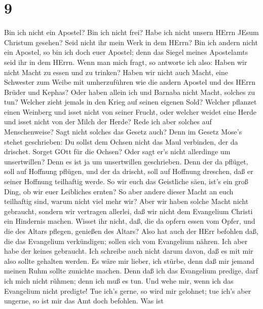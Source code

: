 \hypertarget{section-8}{%
\section{9}\label{section-8}}

 Bin ich nicht ein Apostel? Bin ich nicht frei? Habe ich
nicht unsern HErrn JEsum Christum gesehen? Seid nicht ihr mein Werk in
dem HErrn?  Bin ich andern nicht ein Apostel, so bin ich
doch euer Apostel; denn das Siegel meines Apostelamts seid ihr in dem
HErrn.  Wenn man mich fragt, so antworte ich also:
 Haben wir nicht Macht zu essen und zu trinken? 
Haben wir nicht auch Macht, eine Schwester zum Weibe mit umherzuführen
wie die andern Apostel und des HErrn Brüder und Kephas? 
Oder haben allein ich und Barnaba nicht Macht, solches zu tun?
 Welcher zieht jemals in den Krieg auf seinen eigenen Sold?
Welcher pflanzet einen Weinberg und isset nicht von seiner Frucht, oder
welcher weidet eine Herde und isset nicht von der Milch der Herde?
 Rede ich aber solches auf Menschenweise? Sagt nicht solches
das Gesetz auch?  Denn im Gesetz Mose's stehet geschrieben:
Du sollst dem Ochsen nicht das Maul verbinden, der da drischet. Sorget
GOtt für die Ochsen?  Oder sagt er's nicht allerdinge um
unsertwillen? Denn es ist ja um unsertwillen geschrieben. Denn der da
pflüget, soll auf Hoffnung pflügen, und der da drischt, soll auf
Hoffnung dreschen, daß er seiner Hoffnung teilhaftig werde.
 So wir euch das Geistliche säen, ist's ein groß Ding, ob
wir euer Leibliches ernten?  So aber andere dieser Macht an
euch teilhaftig sind, warum nicht viel mehr wir? Aber wir haben solche
Macht nicht gebraucht, sondern wir vertragen allerlei, daß wir nicht dem
Evangelium Christi ein Hindernis machen.  Wisset ihr nicht,
daß, die da opfern essen vom Opfer, und die des Altars pflegen, genießen
des Altars?  Also hat auch der HErr befohlen daß, die das
Evangelium verkündigen; sollen sich vom Evangelium nähren. 
Ich aber habe der keines gebraucht. Ich schreibe auch nicht darum davon,
daß es mit mir also sollte gehalten werden. Es wäre mir lieber, ich
stürbe, denn daß mir jemand meinen Ruhm sollte zunichte machen.
 Denn daß ich das Evangelium predige, darf ich mich nicht
rühmen; denn ich muß es tun. Und wehe mir, wenn ich das Evangelium nicht
predigte!  Tue ich's gerne, so wird mir gelohnet; tue ich's
aber ungerne, so ist mir das Amt doch befohlen.  Was ist
